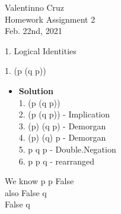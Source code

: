 \documentclass[11pt]{article}
\begin{document}
\begin{center}
    {\Large Valentinno Cruz\\
    Homework Assignment 2\\
    Feb. 22nd, 2021\\}

\end{center}



\begin{flushleft}
{\Large 1. Logical Identities}
\end{flushleft}



\begin{enumerate}

\begin{flushleft}
{\large 1. \neg (p \rightarrow(q \rightarrow p))}
\end{flushleft}

\begin{itemize}

\item \textbf{Solution}\\
\large 1. \neg (p \rightarrow(q \rightarrow p))\\
\large 2. \neg (\neg p \lor (\neg q \lor p))  - Implication \\
\large 3. \neg(\neg p) \land \neg(\neg q \lor p) - Demorgan \\
\large 4. \neg (\neg p) \land \neg(\neg q) \land \neg p - Demorgan \\
\large 5. p \land q \land \neg p - Double.Negation\\
\large 6. p \land \neg p \land q - rearranged \\
\end {itemize}
\large We know \neg p \land p \equiv False\\
\large also \hspace{.2cm}False \land q \\
\large \therefore False \equiv q\\ 

\end {enumerate}
\end{document}
